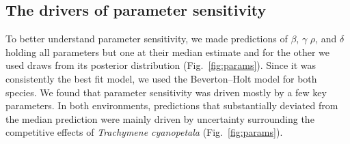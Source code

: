 \begin{refsection}
\begin{table}[H]
\caption{Combined LOOIC, weights and proportion of coexistence for different model combinations in the \textit{woody} environment. Combined LOOIC and weights were calculated as the sum and product of both model's LOOIC and weights, respectively. Proportion of coexistence quantifies the proportion of coexistence predictions relative to competitive exclusion predictions for each model combination.}
\label{tab:proportions_woody}
\end{table}



\subsection*{ The drivers of parameter sensitivity }

To better understand parameter sensitivity, we made predictions of $\beta$, $\gamma$ $\rho$, and $\delta$ holding all parameters but one at their median
estimate and for the other we used draws from its posterior distribution (Fig.~\ref{fig:params}). Since it was consistently the best fit model, we used the Beverton--Holt model for both species. We found that parameter sensitivity was driven mostly by a few key parameters. In both environments, predictions that substantially deviated from the median prediction were mainly driven by uncertainty surrounding the competitive effects of \textit{Trachymene cyanopetala} (Fig.~\ref{fig:params}).



\end{refsection}
